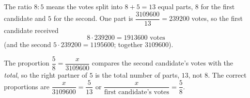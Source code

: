 The ratio $8:5$ means the votes split into $8+5=13$ equal parts, $8$ for the first candidate and $5$ for the second. One part is $\dfrac{3109600}{13}=239200$ votes, so the first candidate received
\[
8\cdot239200=\boxed{1913600}\text{ votes}
\]
(and the second $5\cdot239200=1195600$; together $3109600$).

The proportion $\dfrac{5}{8}=\dfrac{x}{3109600}$ compares the second candidate's votes with the \emph{total}, so the right partner of $5$ is the total number of parts, $13$, not $8$. The correct proportions are $\dfrac{x}{3109600}=\dfrac{5}{13}$ or $\dfrac{x}{\text{first candidate's votes}}=\dfrac{5}{8}$.
